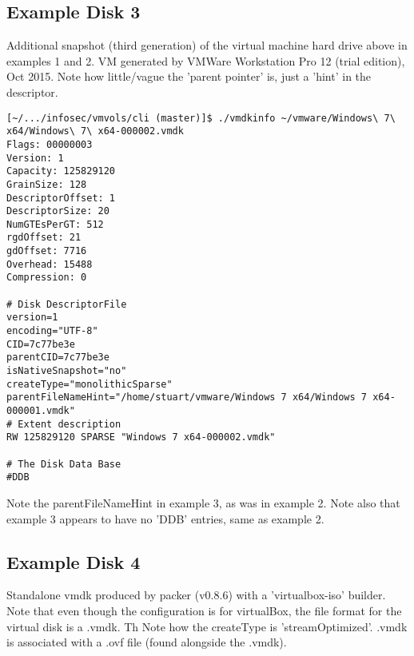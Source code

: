 \documentclass{article}
\begin{document}
\subsection{Example Disk 3}

Additional snapshot (third generation) of the virtual machine hard
drive above in examples 1 and 2. VM generated by VMWare Workstation
Pro 12 (trial edition), Oct 2015.  Note how little/vague the 'parent
pointer' is, just a 'hint' in the descriptor.

\begin{verbatim}
[~/.../infosec/vmvols/cli (master)]$ ./vmdkinfo ~/vmware/Windows\ 7\ x64/Windows\ 7\ x64-000002.vmdk 
Flags: 00000003
Version: 1
Capacity: 125829120
GrainSize: 128
DescriptorOffset: 1
DescriptorSize: 20
NumGTEsPerGT: 512
rgdOffset: 21
gdOffset: 7716
Overhead: 15488
Compression: 0

# Disk DescriptorFile
version=1
encoding="UTF-8"
CID=7c77be3e
parentCID=7c77be3e
isNativeSnapshot="no"
createType="monolithicSparse"
parentFileNameHint="/home/stuart/vmware/Windows 7 x64/Windows 7 x64-000001.vmdk"
# Extent description
RW 125829120 SPARSE "Windows 7 x64-000002.vmdk"

# The Disk Data Base 
#DDB
\end{verbatim}

Note the parentFileNameHint in example 3, as was in example 2.  Note
also that example 3 appears to have no 'DDB' entries, same as example 2.


\subsection{Example Disk 4}

Standalone vmdk produced by packer (v0.8.6) with a 'virtualbox-iso'
builder.  Note that even though the configuration is for virtualBox,
the file format for the virtual disk is a .vmdk.  Th
Note how the createType is 'streamOptimized'.  .vmdk is associated
with a .ovf file (found alongside the .vmdk).
\end{document}
